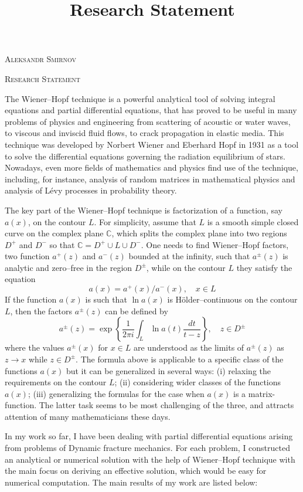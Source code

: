 \documentclass[11pt]{amsart}
\title{Research Statement}
\begin{document}
\begin{center}
	\textsc{Aleksandr Smirnov}
    
    \textsc{Research Statement}
\end{center}

\bigskip

The Wiener--Hopf technique is a powerful analytical tool of solving integral equations and partial differential equations, that has proved to be useful in many problems of physics and engineering from scattering of acoustic or water waves, to viscous and inviscid fluid flows, to crack propagation in elastic media. This technique was developed by Norbert Wiener and Eberhard Hopf in 1931 as a tool to solve the differential equations governing the radiation equilibrium of stars. Nowadays, even more fields of mathematics and physics find use of the technique, including, for instance, analysis of random matrices in mathematical physics and analysis of L\'evy processes in probability theory.

The key part of the Wiener--Hopf technique is factorization of a function, say $a(x)$, on the contour $L$. For simplicity, assume that $L$ is a smooth simple closed curve on the complex plane $\mathbb C$, which splits the complex plane into two  regions $D^+$ and $D^-$ so that $\mathbb C=D^+\cup L\cup D^-$. One needs to find Wiener--Hopf factors, two function $a^+(z)$ and $a^-(z)$ bounded at the infinity, such that $a^\pm(z)$ is analytic and zero--free in the region $D^\pm$, while on the contour $L$ they satisfy the equation
$$
	a(x)=a^+(x)/a^-(x),\quad x\in L
$$
If the function $a(x)$ is such that $\ln a(x)$ is H\"older--continuous on the contour $L$, then the factors $a^\pm(z)$ can be defined by
$$
	a^\pm(z)=\exp\left\{\frac1{2\pi i}\int_{L}\ln a(t)\frac{dt}{t-z}\right\},\quad z\in D^\pm
$$
where the values $a^\pm(x)$ for $x\in L$ are understood as the limits of $a^\pm(z)$ as $z\to x$ while $z\in D^\pm$. The formula above is applicable to a specific class of the functions $a(x)$ but it can be generalized in several ways: (i) relaxing the requirements on the contour $L$; (ii) considering wider classes of the functions $a(x)$; (iii) generalizing the formulas for the case when $a(x)$ is a matrix-function. The latter task seems to be most challenging of the three, and attracts attention of many mathematicians these days. 

In my work so far, I have been dealing with partial differential equations arising from problems of Dynamic fracture mechanics. For each problem, I constructed an analytical or numerical solution with the help of Wiener--Hopf technique with the main focus on deriving an effective solution, which would be easy for numerical computation. The main results of my work are listed below:
\end{document}
